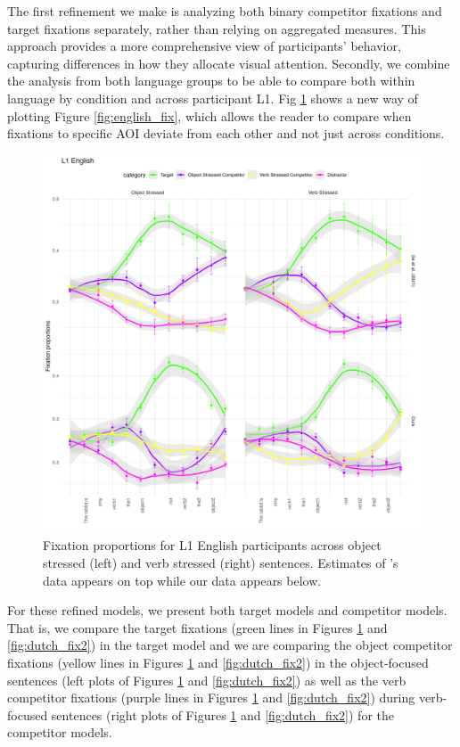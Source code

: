 The first refinement we make is analyzing both binary competitor fixations and target fixations separately, rather than relying on aggregated measures. This approach provides a more comprehensive view of participants’ behavior, capturing differences in how they allocate visual attention. Secondly, we combine the analysis from both language groups to be able to compare both within language by condition and across participant L1. Fig \ref{fig:english_fix2} shows a new way of plotting Figure \ref{fig:english_fix}, which allows the reader to compare when fixations to specific AOI deviate from each other and not just across conditions.

\begin{figure}[H]  %
    \centering
    \includegraphics[width=\textwidth,height=\textheight,keepaspectratio]{viz/english_fix2.png}
    \caption{Fixation proportions for L1 English participants across object stressed (left) and verb stressed (right) sentences. Estimates of \textcite{ge2021a}'s data appears on top while our data appears below.}
    \label{fig:english_fix2}
\end{figure}

For these refined models, we present both target models and competitor models. That is, we compare the target fixations (green lines in Figures \ref{fig:english_fix2} and \ref{fig:dutch_fix2}) in the target model and we are comparing the object competitor fixations (yellow lines in Figures \ref{fig:english_fix2} and \ref{fig:dutch_fix2}) in the object-focused sentences (left plots of Figures \ref{fig:english_fix2} and \ref{fig:dutch_fix2}) as well as the verb competitor fixations (purple lines in Figures \ref{fig:english_fix2} and \ref{fig:dutch_fix2}) during verb-focused sentences (right plots of Figures \ref{fig:english_fix2} and \ref{fig:dutch_fix2}) for the competitor models. 

